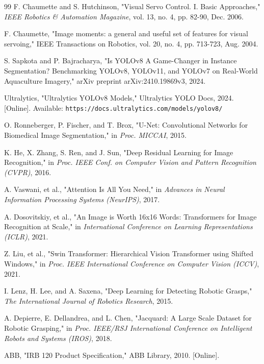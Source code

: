 \begin{thebibliography}{99}
 F. Chaumette and S. Hutchinson, "Visual Servo Control. I. Basic Approaches," \textit{IEEE Robotics \& Automation Magazine}, vol. 13, no. 4, pp. 82-90, Dec. 2006.

 F. Chaumette, "Image moments: a general and useful set of features for visual servoing," IEEE Transactions on Robotics, vol. 20, no. 4, pp. 713-723, Aug. 2004.

 S. Sapkota and P. Bajracharya, "Is YOLOv8 A Game-Changer in Instance Segmentation? Benchmarking YOLOv8, YOLOv11, and YOLOv7 on Real-World Aquaculture Imagery," arXiv preprint arXiv:2410.19869v3, 2024.

 Ultralytics, "Ultralytics YOLOv8 Models," Ultralytics YOLO Docs, 2024. [Online]. Available: \texttt{https://docs.ultralytics.com/models/yolov8/}

 O. Ronneberger, P. Fischer, and T. Brox, "U-Net: Convolutional Networks for Biomedical Image Segmentation," in \textit{Proc. MICCAI}, 2015.

 K. He, X. Zhang, S. Ren, and J. Sun, "Deep Residual Learning for Image Recognition," in \textit{Proc. IEEE Conf. on Computer Vision and Pattern Recognition (CVPR)}, 2016.

 A. Vaswani, et al., "Attention Is All You Need," in \textit{Advances in Neural Information Processing Systems (NeurIPS)}, 2017.

 A. Dosovitskiy, et al., "An Image is Worth 16x16 Words: Transformers for Image Recognition at Scale," in \textit{International Conference on Learning Representations (ICLR)}, 2021.

 Z. Liu, et al., "Swin Transformer: Hierarchical Vision Transformer using Shifted Windows," in \textit{Proc. IEEE International Conference on Computer Vision (ICCV)}, 2021.

 I. Lenz, H. Lee, and A. Saxena, "Deep Learning for Detecting Robotic Grasps," \textit{The International Journal of Robotics Research}, 2015.

 A. Depierre, E. Dellandrea, and L. Chen, "Jacquard: A Large Scale Dataset for Robotic Grasping," in \textit{Proc. IEEE/RSJ International Conference on Intelligent Robots and Systems (IROS)}, 2018.

 ABB, "IRB 120 Product Specification," ABB Library, 2010. [Online].


\end{thebibliography}
